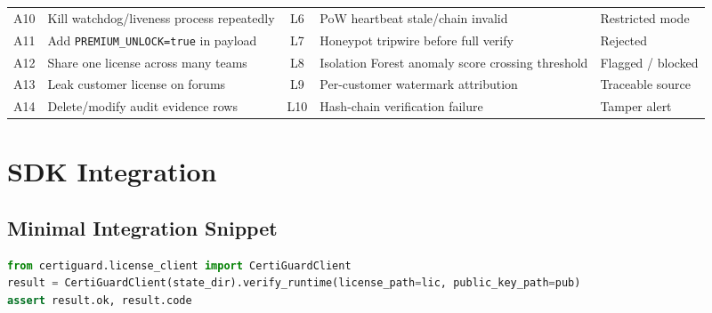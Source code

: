 \documentclass[11pt,a4paper]{article}
\begin{document}
\begin{table}[H]
\begin{tabularx}{\textwidth}{c Y c Y Y}
A10 & Kill watchdog/liveness process repeatedly & L6 & PoW heartbeat stale/chain invalid & Restricted mode \\
A11 & Add \texttt{PREMIUM\_UNLOCK=true} in payload & L7 & Honeypot tripwire before full verify & Rejected \\
A12 & Share one license across many teams & L8 & Isolation Forest anomaly score crossing threshold & Flagged / blocked \\
A13 & Leak customer license on forums & L9 & Per-customer watermark attribution & Traceable source \\
A14 & Delete/modify audit evidence rows & L10 & Hash-chain verification failure & Tamper alert \\
\bottomrule
\end{tabularx}
\end{table}

\section{SDK Integration}

\subsection{Minimal Integration Snippet}
\begin{lstlisting}[language=Python,caption={Three-line host application integration}]
from certiguard.license_client import CertiGuardClient
result = CertiGuardClient(state_dir).verify_runtime(license_path=lic, public_key_path=pub)
assert result.ok, result.code
\end{lstlisting}
\end{document}
